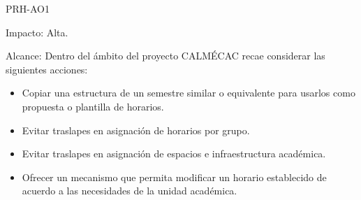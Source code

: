 \begin{AreaOportunidad}{PRH-AO1}
	
	
	
	
	
	
	\item[Impacto:] Alta.
	
	\item[Alcance:] Dentro del ámbito del proyecto CALMÉCAC recae considerar las siguientes acciones:
	\begin{itemize}
		\item Copiar una estructura de un semestre similar o equivalente  para usarlos como propuesta o plantilla de horarios.
		\item Evitar traslapes en asignación de horarios por grupo.
		\item Evitar traslapes en asignación de espacios e infraestructura académica.
		\item Ofrecer un mecanismo que permita modificar un horario establecido de acuerdo a las necesidades de la unidad académica.
	\end{itemize}
	
\end{AreaOportunidad}

